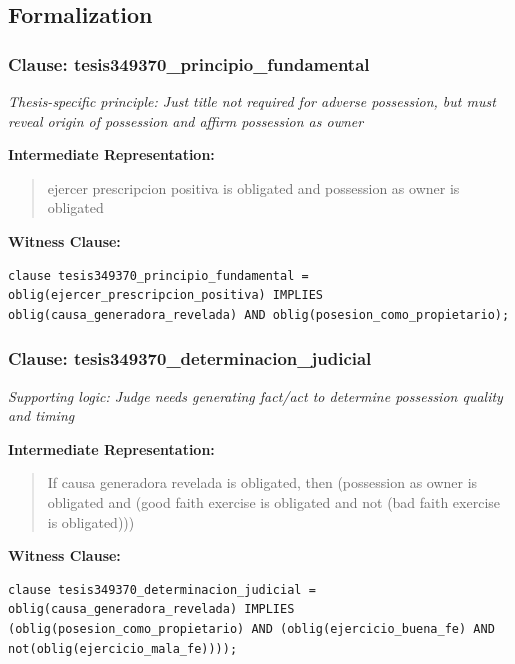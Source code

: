 \documentclass[11pt,a4paper]{article}
\begin{document}
\subsection{Formalization}

\subsubsection{Clause: tesis349370\_principio\_fundamental}

\textit{Thesis-specific principle: Just title not required for adverse possession, but must reveal origin of possession and affirm possession as owner}

\textbf{Intermediate Representation:}

\begin{quote}
ejercer prescripcion positiva is obligated and possession as owner is obligated
\end{quote}

\textbf{Witness Clause:}

\begin{lstlisting}[style=witnessstyle, language=Witness]
clause tesis349370_principio_fundamental = oblig(ejercer_prescripcion_positiva) IMPLIES oblig(causa_generadora_revelada) AND oblig(posesion_como_propietario);
\end{lstlisting}

\subsubsection{Clause: tesis349370\_determinacion\_judicial}

\textit{Supporting logic: Judge needs generating fact/act to determine possession quality and timing}

\textbf{Intermediate Representation:}

\begin{quote}
If causa generadora revelada is obligated, then (possession as owner is obligated and (good faith exercise is obligated and not (bad faith exercise is obligated)))
\end{quote}

\textbf{Witness Clause:}

\begin{lstlisting}[style=witnessstyle, language=Witness]
clause tesis349370_determinacion_judicial = oblig(causa_generadora_revelada) IMPLIES (oblig(posesion_como_propietario) AND (oblig(ejercicio_buena_fe) AND not(oblig(ejercicio_mala_fe))));
\end{lstlisting}
\end{document}
